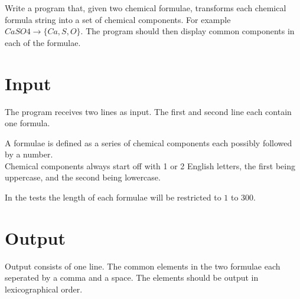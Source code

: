 Write a program that, given two chemical formulae,
transforms each chemical formula string into a set of chemical components.
For example $CaSO4 \rightarrow \{Ca, S, O\}$.
The program should then display common components in each of the formulae. \\

\section*{Input}
The program receives two lines as input.
The first and second line each contain one formula.

A formulae is defined as a series of chemical components each possibly followed by a number.\\
Chemical components always start off with 1 or 2 English letters, the first being uppercase, and the second being lowercase.

In the tests the length of each formulae will be restricted to $1$ to $300$.

\section*{Output}
Output consists of one line. 
The common elements in the two formulae each seperated by a comma and a space.
The elements should be output in lexicographical order.

